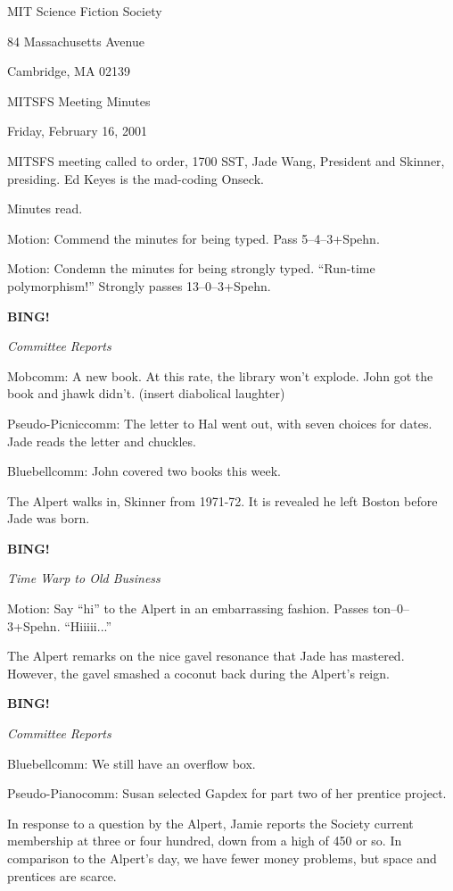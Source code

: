 \documentclass[12pt]{article}
\newcommand{\bing}{{\bf BING!} }
\newcommand{\goto}[1]{\bing \vskip 12pt \centerline{{\em{#1}}}}
\begin{document}
\begin{center}

MIT Science Fiction Society 

84 Massachusetts Avenue

Cambridge, MA 02139

\vspace{12pt}

MITSFS Meeting Minutes 

Friday, February 16, 2001

\end{center}
 
\vspace{18pt}

\setlength{\parskip}{6pt}

\noindent
MITSFS meeting called to order, 1700 SST, Jade Wang, President and
Skinner, presiding.  Ed Keyes is the mad-coding Onseck.

Minutes read.

Motion: Commend the minutes for being typed.  Pass 5--4--3+Spehn.

Motion: Condemn the minutes for being strongly typed.  ``Run-time
polymorphism!''  Strongly passes 13--0--3+Spehn.

\goto{Committee Reports}

Mobcomm: A new book.  At this rate, the library won't explode.
John got the book and jhawk didn't.  (insert diabolical laughter)

Pseudo-Picniccomm: The letter to Hal went out, with seven choices
for dates.  Jade reads the letter and chuckles.

Bluebellcomm: John covered two books this week.

The Alpert walks in, Skinner from 1971-72.  It is revealed he left
Boston before Jade was born.

\goto{Time Warp to Old Business}

Motion: Say ``hi'' to the Alpert in an embarrassing fashion.  Passes
ton--0--3+Spehn.  ``Hiiiii...''

The Alpert remarks on the nice gavel resonance that Jade has mastered.
However, the gavel smashed a coconut back during the Alpert's reign.

\goto{Committee Reports}

Bluebellcomm: We still have an overflow box.

Pseudo-Pianocomm: Susan selected Gapdex for part two of her prentice
project.

In response to a question by the Alpert, Jamie reports the Society
current membership at three or four hundred, down from a high of
450 or so.  In comparison to the Alpert's day, we have fewer money
problems, but space and prentices are scarce.
\end{document}
